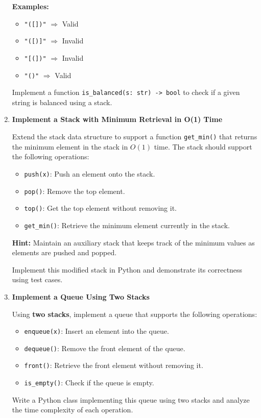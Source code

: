\documentclass{article}
\begin{document}
\begin{enumerate}
    \textbf{Examples:}
    \begin{itemize}
        \item \texttt{"({[]})"} $\Rightarrow$ Valid
        \item \texttt{"({[)]}"} $\Rightarrow$ Invalid
        \item \texttt{"{[(])}"} $\Rightarrow$ Invalid
        \item \texttt{"()"} $\Rightarrow$ Valid
    \end{itemize}
    Implement a function \texttt{is\_balanced(s: str) -> bool} to check if a given string is balanced using a stack.
    
    \item \textbf{Implement a Stack with Minimum Retrieval in O(1) Time}
    
    Extend the stack data structure to support a function \texttt{get\_min()} that returns the minimum element in the stack in $O(1)$ time. The stack should support the following operations:
    \begin{itemize}
        \item \texttt{push(x)}: Push an element onto the stack.
        \item \texttt{pop()}: Remove the top element.
        \item \texttt{top()}: Get the top element without removing it.
        \item \texttt{get\_min()}: Retrieve the minimum element currently in the stack.
    \end{itemize}
    
    \textbf{Hint:} Maintain an auxiliary stack that keeps track of the minimum values as elements are pushed and popped.
    
    Implement this modified stack in Python and demonstrate its correctness using test cases.
    
    \item \textbf{Implement a Queue Using Two Stacks}
    
    Using \textbf{two stacks}, implement a queue that supports the following operations:
    \begin{itemize}
        \item \texttt{enqueue(x)}: Insert an element into the queue.
        \item \texttt{dequeue()}: Remove the front element of the queue.
        \item \texttt{front()}: Retrieve the front element without removing it.
        \item \texttt{is\_empty()}: Check if the queue is empty.
    \end{itemize}
    Write a Python class implementing this queue using two stacks and analyze the time complexity of each operation.
    

\end{enumerate}
\end{document}
